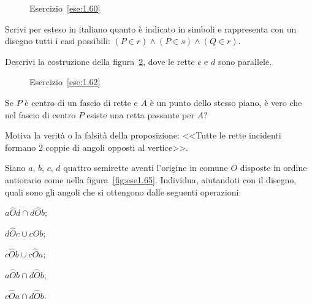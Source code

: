 \begin{figure}[htb]
 \centering
 \caption{Esercizio~\ref{ese:1.60}}\label{fig:ese1.60}
\end{figure}

\begin{esercizio}
\label{ese:1.61}
Scrivi per esteso in italiano quanto è indicato in simboli e rappresenta con un disegno tutti i casi possibili: $(P\in r)\wedge (P\in s)\wedge (Q\in r)$.
\end{esercizio}

\begin{esercizio}
\label{ese:1.62}
Descrivi la costruzione della figura~\ref{fig:ese1.62}, dove le rette $c$ e $d$ sono parallele.
\end{esercizio}

\begin{figure}[htb]
 \centering
 \caption{Esercizio~\ref{ese:1.62}}\label{fig:ese1.62}
\end{figure}
 
\begin{esercizio}
\label{ese:1.63}
Se $P$ è centro di un fascio di rette e $A$ è un punto dello stesso piano, è vero che nel fascio di centro $P$ esiste una retta passante per $A$?
\end{esercizio}

\begin{esercizio}
\label{ese:1.64}
Motiva la verità o la falsità della proposizione: <<Tutte le rette incidenti formano 2 coppie di angoli opposti al vertice>>.
\end{esercizio}

\begin{esercizio}
\label{ese:1.65}
Siano $a$, $b$, $c$, $d$ quattro semirette aventi l'origine in comune $O$ disposte in ordine antiorario come nella figura~\ref{fig:ese1.65}. Individua, aiutandoti con il disegno, quali sono gli angoli che si ottengono dalle seguenti operazioni:
\begin{multicols}{3}
\begin{enumeratea}
\item $a\widehat{O}d \cap d\widehat{O}b$;
\item $d\widehat{O}c \cup c\widehat{O}b$;
\item $c\widehat{O}b \cup c\widehat{O}a$;
\item $a\widehat{O}b \cap d\widehat{O}b$;
\item $c\widehat{O}a \cap d\widehat{O}b$.
\end{enumeratea}
\end{multicols}
\end{esercizio}

